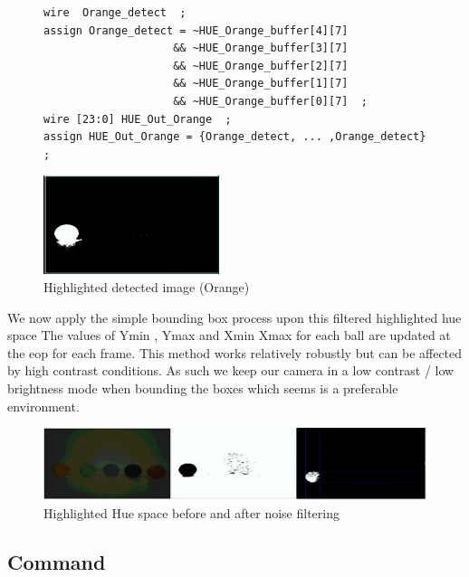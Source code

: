 \documentclass[10pt,twoside]{article}
\begin{document}
\begin{figure}[hbt]
\begin{minipage}{.49\textwidth}
\begin{verbatim}
wire  Orange_detect  ; 
assign Orange_detect = ~HUE_Orange_buffer[4][7] 
                    && ~HUE_Orange_buffer[3][7] 
                    && ~HUE_Orange_buffer[2][7] 
                    && ~HUE_Orange_buffer[1][7] 
                    && ~HUE_Orange_buffer[0][7]  ; 
wire [23:0] HUE_Out_Orange  ;
assign HUE_Out_Orange = {Orange_detect, ... ,Orange_detect} ; 

\end{verbatim}
\end{minipage}
\begin{minipage}{.49\textwidth}
            \includegraphics[scale = .8]{Detect.PNG}
            \centering
            \caption{Highlighted detected image (Orange)}
            \label{fig:InitalDesign}
\end{minipage}
\end{figure}

We now apply the simple bounding box process upon this filtered highlighted hue space The values of Ymin , Ymax and Xmin Xmax for each ball are updated at the eop for each frame. This method works relatively robustly but can be affected by high contrast conditions. As such we keep our camera in a low contrast / low brightness mode when bounding the boxes which seems is a preferable environment. 

\begin{figure}[hbt]
    \centering
    \includegraphics[scale = 0.25]{AnalysisImag.PNG}
    \caption{Highlighted Hue space before and after noise filtering}
    \label{fig:HightedHueSpace}
\end{figure}



\newpage
\newpage
\subsection{Command}
\end{document}
